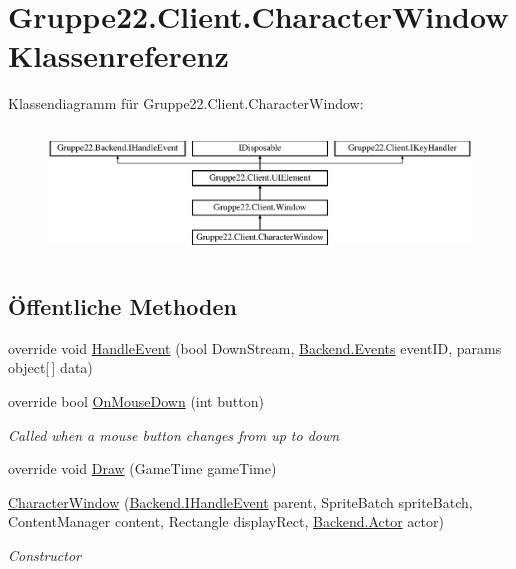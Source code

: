 \hypertarget{class_gruppe22_1_1_client_1_1_character_window}{\section{Gruppe22.\-Client.\-Character\-Window Klassenreferenz}
\label{class_gruppe22_1_1_client_1_1_character_window}
}
Klassendiagramm für Gruppe22.\-Client.\-Character\-Window\-:\begin{figure}[H]
\begin{center}
\leavevmode
\includegraphics[height=3.440860cm]{class_gruppe22_1_1_client_1_1_character_window}
\end{center}
\end{figure}
\subsection*{Öffentliche Methoden}
\begin{DoxyCompactItemize}
\item 
override void \hyperlink{class_gruppe22_1_1_client_1_1_character_window_a048ae6a552fbaa709f33c19730d593f3}{Handle\-Event} (bool Down\-Stream, \hyperlink{namespace_gruppe22_1_1_backend_ab56df91bb0bdafa1ea978e552209ce73}{Backend.\-Events} event\-I\-D, params object\mbox{[}$\,$\mbox{]} data)
\item 
override bool \hyperlink{class_gruppe22_1_1_client_1_1_character_window_abb07535d47bf7bcecfc92045c9a91116}{On\-Mouse\-Down} (int button)
\begin{DoxyCompactList}\small\item\em Called when a mouse button changes from up to down \end{DoxyCompactList}\item 
override void \hyperlink{class_gruppe22_1_1_client_1_1_character_window_a9cd2befa924c9fdf68a0428d9ed1746e}{Draw} (Game\-Time game\-Time)
\item 
\hyperlink{class_gruppe22_1_1_client_1_1_character_window_abc793603a863ec208d9e86ddb8514525}{Character\-Window} (\hyperlink{interface_gruppe22_1_1_backend_1_1_i_handle_event}{Backend.\-I\-Handle\-Event} parent, Sprite\-Batch sprite\-Batch, Content\-Manager content, Rectangle display\-Rect, \hyperlink{class_gruppe22_1_1_backend_1_1_actor}{Backend.\-Actor} actor)
\begin{DoxyCompactList}\small\item\em Constructor \end{DoxyCompactList}\end{DoxyCompactItemize}
